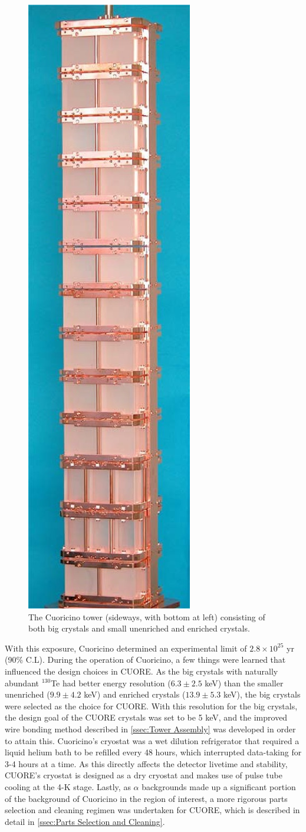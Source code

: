 \begin{figure}[htbp]
    \centering
    \includegraphics[width=0.8\linewidth, height=0.8\linewidth, keepaspectratio, angle=270, origin = c]{Figures/CUORICINO.jpg}
    \vspace*{-1.5 in}
    \caption[The Cuoricino tower consisting of both big crystals and small unenriched and enriched crystals.]
    {The Cuoricino tower (sideways, with bottom at left) consisting of both big crystals and small unenriched and enriched crystals.}
    \label{fig:Cuoricino_tower}
\end{figure}

With this exposure, Cuoricino determined an experimental limit of $2.8\times10^{25}$ yr (90\% C.L).
During the operation of Cuoricino, a few things were learned that influenced the design choices in CUORE.
As the big crystals with naturally abundant $^{130}$Te had better energy resolution ($6.3 \pm2.5$ keV) than the smaller unenriched ($9.9\pm4.2$ keV) and enriched crystals ($13.9\pm5.3$ keV), the big crystals were selected as the choice for CUORE.
With this resolution for the big crystals, the design goal of the CUORE crystals was set to be 5 keV, and the improved wire bonding method described in \autoref{ssec:Tower Assembly} was developed in order to attain this.
Cuoricino's cryostat was a wet dilution refrigerator that required a liquid helium bath to be refilled every 48 hours, which interrupted data-taking for 3-4 hours at a time.
As this directly affects the detector livetime and stability, CUORE's cryostat is designed as a dry cryostat and makes use of pulse tube cooling at the 4-K stage.
Lastly, as $\alpha$ backgrounds made up a significant portion of the background of Cuoricino in the region of interest, a more rigorous parts selection and cleaning regimen was undertaken for CUORE, which is described in detail in \autoref{ssec:Parts Selection and Cleaning}.

